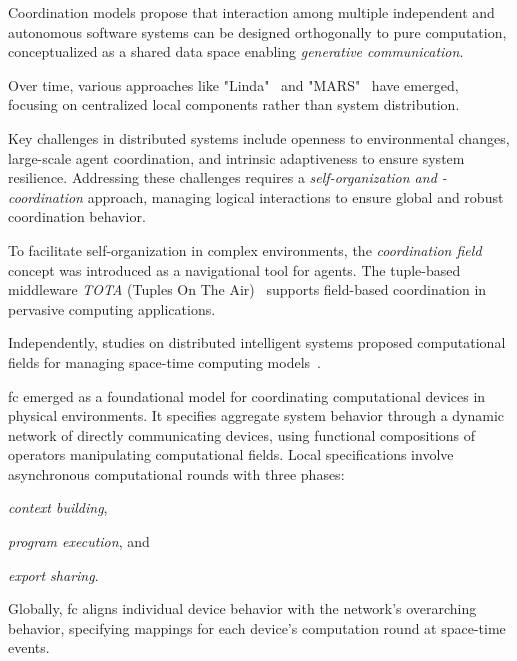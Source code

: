 \documentclass[12pt, a4paper]{article}
\newenvironment{inlinelist}{\begin{enumerate*}[label=\emph{(\roman*)}]}{\end{enumerate*}}
\begin{document}
Coordination models propose that interaction among multiple independent and autonomous software systems can be designed
orthogonally to pure computation, conceptualized as a shared data space enabling \emph{generative communication}.

Over time, various approaches like "Linda"~\cite{ViroliCoordination2012} and "MARS"~\cite{mars} have emerged,
focusing on centralized local components rather than system distribution.

Key challenges in distributed systems include openness to environmental changes, large-scale agent coordination,
and intrinsic adaptiveness to ensure system resilience.
%
Addressing these challenges requires a \emph{self-organization and -coordination} approach, managing logical interactions to
ensure global and robust coordination behavior.

To facilitate self-organization in complex environments, the \emph{coordination field} concept was introduced as a
navigational tool for agents.
%
The tuple-based middleware \textit{TOTA} (Tuples On The Air)~\cite{tota} supports field-based coordination in pervasive
computing applications.

Independently, studies on distributed intelligent systems proposed computational fields for managing space-time
computing models~\cite{JLAMP2019}.

\ac{fc} emerged as a foundational model for coordinating computational devices in physical environments.
%
It specifies aggregate system behavior through a dynamic network of directly communicating devices,
using functional compositions of operators manipulating computational fields.
%
Local specifications involve asynchronous computational rounds with three phases:
\begin{inlinelist}
    \item \emph{context building},
    \item \emph{program execution}, and
    \item \emph{export sharing}.
\end{inlinelist}

Globally,
\ac{fc} aligns individual device behavior with the network's overarching behavior,
specifying mappings for each device's computation round at space-time events.
\end{document}
